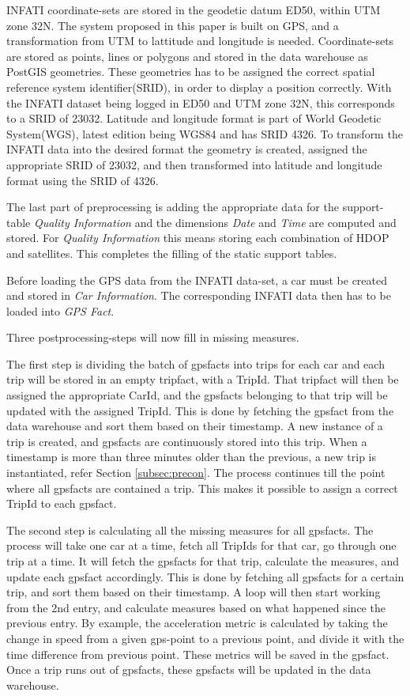 INFATI coordinate-sets are stored in the geodetic datum ED50, within UTM zone 32N. The system proposed in this paper is built on GPS, and a transformation from UTM to lattitude and longitude is needed. Coordinate-sets are stored as points, lines or polygons and stored in the data warehouse as PostGIS\cite{postgis} geometries. These geometries has to be assigned the correct spatial reference system identifier(SRID), in order to display a position correctly. With the INFATI dataset being logged in ED50 and UTM zone 32N, this corresponds to a SRID of 23032\cite{UTM32N}. Latitude and longitude format is part of World Geodetic System(WGS), latest edition being WGS84 and has SRID 4326\cite{WGS84}. To transform the INFATI data into the desired format the geometry is created, assigned the appropriate SRID of 23032, and then transformed into latitude and longitude format using the SRID of 4326.

The last part of preprocessing is adding the appropriate data for the support-table \textit{Quality Information} and the dimensions \textit{Date} and \textit{Time} are computed and stored. For \textit{Quality Information} this means storing each combination of HDOP and satellites. This completes the filling of the static support tables.

Before loading the GPS data from the INFATI data-set, a car must be created and stored in \textit{Car Information}. The corresponding INFATI data then has to be loaded into \textit{GPS Fact}. 

Three postprocessing-steps will now fill in missing measures.

The first step is dividing the batch of gpsfacts into trips for each car and each trip will be stored in an empty tripfact, with a TripId. That tripfact will then be assigned the appropriate CarId, and the gpsfacts belonging to that trip will be updated with the assigned TripId. This is done by fetching the gpsfact from the data warehouse and sort them based on their timestamp. A new instance of a trip is created, and gpsfacts are continuously stored into this trip. When a timestamp is more than three minutes older than the previous, a new trip is instantiated, refer Section \ref{subsec:precon}. The process continues till the point where all gpsfacts are contained a trip. This makes it possible to  assign a correct TripId to each gpsfact.

The second step is calculating all the missing measures for all gpsfacts. The process will take one car at a time, fetch all TripIds for that car, go through one trip at a time. It will fetch the gpsfacts for that trip, calculate the measures, and update each gpsfact accordingly. This is done by fetching all gpsfacts for a certain trip, and sort them based on their timestamp. A loop will then start working from the 2nd entry, and calculate measures based on what happened since the previous entry.  By example, the acceleration metric is calculated by taking the change in speed from a given gps-point to a previous point, and divide it with the time difference from previous point. These metrics will be saved in the gpsfact. Once a trip runs out of gpsfacts, these gpsfacts will be updated in the data warehouse.

